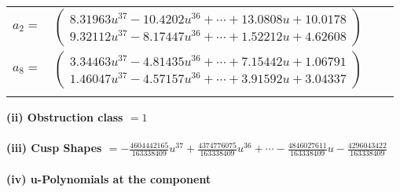 \documentclass[1p]{elsarticle_modified}
\theoremstyle{definition}
\begin{document}
\begin{tabular}{m{7pt} m{180pt} m{7pt} m{180pt} }
\flushright $a_{2}=$&$\begin{pmatrix}8.31963 u^{37}-10.4202 u^{36}+\cdots+13.0808 u+10.0178\\9.32112 u^{37}-8.17447 u^{36}+\cdots+1.52212 u+4.62608\end{pmatrix}$ \\
\flushright $a_{8}=$&$\begin{pmatrix}3.34463 u^{37}-4.81435 u^{36}+\cdots+7.15442 u+1.06791\\1.46047 u^{37}-4.57157 u^{36}+\cdots+3.91592 u+3.04337\end{pmatrix}$\\&\end{tabular}
\flushleft \textbf{(ii) Obstruction class $= 1$}\\~\\
\flushleft \textbf{(iii) Cusp Shapes $= -\frac{4604442165}{163338409} u^{37}+\frac{4374776075}{163338409} u^{36}+\cdots-\frac{4846027611}{163338409} u-\frac{4296043422}{163338409}$}\\~\\
\newpage\renewcommand{\arraystretch}{1}
\flushleft \textbf{(iv) u-Polynomials at the component}\newline \\
\end{document}
